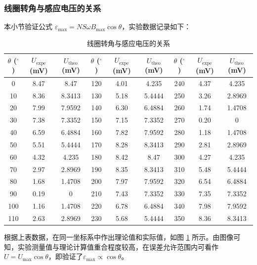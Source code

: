 \documentclass[UTF8]{article}
\theoremstyle{MyLineTheoremStyle} %
\theoremstyle{MyBlockTheoremStyle} %
\theoremstyle{MySubsubsectionStyle} %
\begin{document}
\subsubsection{线圈转角与感应电压的关系}
本小节验证公式 $ \varepsilon_{\max}=NS\omega B_{\max}\cos\theta $，实验数据记录如下：
\begin{table}[H]\centering
    \caption{线圈转角与感应电压的关系}
    \label{线圈转角与感应电压的关系}
\begin{tabular}{|ccc|ccc|ccc|}\toprule
    $\theta$ ($^\circ$) & $U_{\text{expe}}$ (mV) & $U_{\text{theo}}$ (mV) & $\theta$ ($^\circ$) & $U_{\text{expe}}$ (mV) & $U_{\text{theo}}$ (mV) & $\theta$ ($^\circ$) & $U_{\text{expe}}$ (mV) & $U_{\text{theo}}$ (mV)   \\
    \midrule
    0	    &8.47	    &  8.47	&120	&4.01	   &  4.235	&240	&4.37	   &  4.235 \\
    10	    &8.36	    &8.3413	&130	&5.18	   & 5.4444	&250	&3.26	   & 2.8969 \\
    20	    &7.99	    &7.9592	&140	&6.30	   & 6.4884	&260	&1.74	   & 1.4708 \\
    30	    &7.38	    &7.3352	&150	&7.15	   & 7.3352	&270	&0.20	   &      0 \\
    40	    &6.59	    &6.4884	&160	&7.82	   & 7.9592	&280	&1.18	   & 1.4708 \\
    50	    &5.51	    &5.4444	&170	&8.28	   & 8.3413	&290	&2.81	   & 2.8969 \\
    60	    &4.32	    & 4.235	&180	&8.42	   &   8.47	&300	&4.27	   &  4.235 \\
    70	    &2.97	    &2.8969	&190	&8.35	   & 8.3413	&310	&5.48	   & 5.4444 \\
    80	    &1.68	    &1.4708	&200	&7.97	   & 7.9592	&320	&6.54	   & 6.4884 \\
    90	    &0.19	    &     0	&210	&7.43	   & 7.3352	&330	&7.35	   & 7.3352 \\
    100	&1.16	    &1.4708	&220	&6.78	   & 6.4884	&340	&7.98	   & 7.9592 \\
    110	&2.63	    &2.8969	&230	&5.68	   & 5.4444	&350	&8.36	   & 8.3413 \\
    \bottomrule
\end{tabular}
\end{table}
根据上表数据，在同一坐标系中作出理论值和实际值，如图 \ref{线圈转角与感应电压的关系} 所示。由图像可知，实验测量值与理论计算值重合程度较高，在误差允许范围内可看作$ U=U_{\max}\cos\theta $，即验证了$ \varepsilon_{\max}\propto\cos\theta $。
\end{document}

